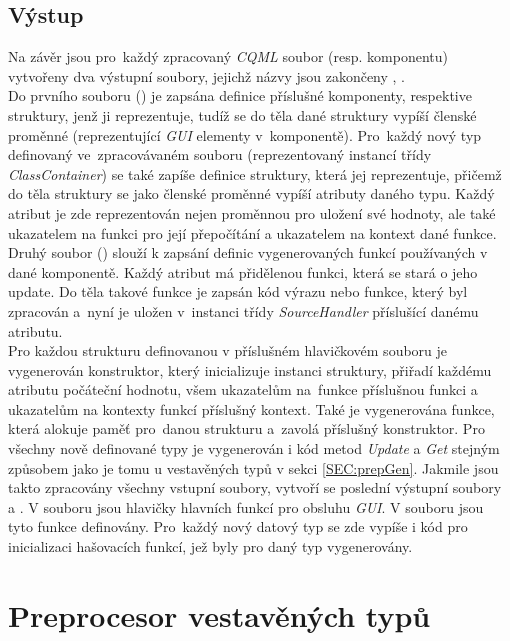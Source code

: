 \documentclass[11pt,twoside,a4paper]{book}
\begin{document}
\subsection{Výstup}
Na závěr jsou pro~každý zpracovaný \textit{CQML} soubor (resp. komponentu) vytvořeny dva výstupní soubory, jejichž názvy jsou zakončeny , .\\ 
Do prvního souboru () je zapsána definice příslušné komponenty, respektive struktury, jenž ji reprezentuje, tudíž se do těla dané struktury vypíší členské proměnné (reprezentující \textit{GUI} elementy v~komponentě). Pro~každý nový typ definovaný ve~zpracovávaném souboru (reprezentovaný instancí třídy \textit{ClassContainer}) se také zapíše definice struktury, která jej reprezentuje, přičemž do těla struktury se jako členské proměnné vypíší atributy daného typu. Každý atribut je zde reprezentován nejen proměnnou pro uložení své hodnoty, ale také ukazatelem na funkci pro její přepočítání a ukazatelem na kontext dané funkce.\\
Druhý soubor () slouží k zapsání definic vygenerovaných funkcí používaných v dané komponentě. Každý atribut má přidělenou funkci, která se stará o jeho update. Do těla takové funkce je zapsán kód výrazu nebo funkce, který byl zpracován a~nyní je uložen v~instanci třídy \textit{SourceHandler} příslušící danému atributu.\\
Pro každou strukturu definovanou v příslušném hlavičkovém souboru je vygenerován konstruktor, který inicializuje instanci struktury, přiřadí každému atributu počáteční hodnotu, všem ukazatelům na~funkce příslušnou funkci a ukazatelům na kontexty funkcí příslušný kontext. Také je vygenerována funkce, která alokuje paměť pro~danou strukturu a~zavolá příslušný konstruktor. Pro všechny nově definované typy je vygenerován i kód metod \textit{Update} a \textit{Get} stejným způsobem jako je tomu u vestavěných typů v sekci \ref{SEC:prepGen}.
Jakmile jsou takto zpracovány všechny vstupní soubory, vytvoří se poslední výstupní soubory  a . V souboru  jsou hlavičky hlavních funkcí pro obsluhu \textit{GUI}. V souboru  jsou tyto funkce definovány. Pro~každý nový datový typ se zde vypíše i kód pro inicializaci hašovacích funkcí, jež byly pro daný typ vygenerovány.\\


\section{\label{SEC:aa}Preprocesor vestavěných typů}
\end{document}
